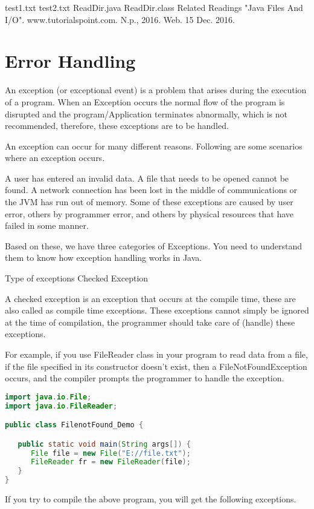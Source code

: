 test1.txt
test2.txt
ReadDir.java
ReadDir.class
Related Readings
"Java Files And I/O". www.tutorialspoint.com. N.p., 2016. Web. 15 Dec. 2016.

\section{Error Handling}

An exception (or exceptional event) is a problem that arises during the execution of a program. When an Exception occurs the normal flow of the program is disrupted and the program/Application terminates abnormally, which is not recommended, therefore, these exceptions are to be handled.

An exception can occur for many different reasons. Following are some scenarios where an exception occurs.

A user has entered an invalid data.
A file that needs to be opened cannot be found.
A network connection has been lost in the middle of communications or the JVM has run out of memory.
Some of these exceptions are caused by user error, others by programmer error, and others by physical resources that have failed in some manner.

Based on these, we have three categories of Exceptions. You need to understand them to know how exception handling works in Java.

Type of exceptions
Checked Exception

A checked exception is an exception that occurs at the compile time, these are also called as compile time exceptions. These exceptions cannot simply be ignored at the time of compilation, the programmer should take care of (handle) these exceptions.

For example, if you use FileReader class in your program to read data from a file, if the file specified in its constructor doesn't exist, then a FileNotFoundException occurs, and the compiler prompts the programmer to handle the exception.

\begin{lstlisting}[language=Java]
import java.io.File;
import java.io.FileReader;

public class FilenotFound_Demo {

   public static void main(String args[]) {
      File file = new File("E://file.txt");
      FileReader fr = new FileReader(file);
   }
}
\end{lstlisting}

If you try to compile the above program, you will get the following exceptions.

